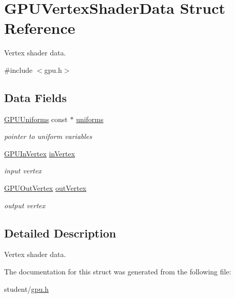 \hypertarget{structGPUVertexShaderData}{}\section{G\+P\+U\+Vertex\+Shader\+Data Struct Reference}
\label{structGPUVertexShaderData}


Vertex shader data.  




{\ttfamily \#include $<$gpu.\+h$>$}

\subsection*{Data Fields}
\begin{DoxyCompactItemize}
\item 
\mbox{\label{structGPUVertexShaderData_a0edb787d17cbca1ce03740b0a4296e0b}} 
\hyperlink{structGPUUniforms}{G\+P\+U\+Uniforms} const  $\ast$ \hyperlink{structGPUVertexShaderData_a0edb787d17cbca1ce03740b0a4296e0b}{uniforms}
\begin{DoxyCompactList}\small\item\em pointer to uniform variables \end{DoxyCompactList}\item 
\mbox{\label{structGPUVertexShaderData_a5744e11986f6ac290817370ed6b45726}} 
\hyperlink{structGPUInVertex}{G\+P\+U\+In\+Vertex} \hyperlink{structGPUVertexShaderData_a5744e11986f6ac290817370ed6b45726}{in\+Vertex}
\begin{DoxyCompactList}\small\item\em input vertex \end{DoxyCompactList}\item 
\mbox{\label{structGPUVertexShaderData_afc21ec723cd5a50da3435f5982b08995}} 
\hyperlink{structGPUOutVertex}{G\+P\+U\+Out\+Vertex} \hyperlink{structGPUVertexShaderData_afc21ec723cd5a50da3435f5982b08995}{out\+Vertex}
\begin{DoxyCompactList}\small\item\em output vertex \end{DoxyCompactList}\end{DoxyCompactItemize}


\subsection{Detailed Description}
Vertex shader data. 

The documentation for this struct was generated from the following file\+:\begin{DoxyCompactItemize}
\item 
student/\hyperlink{gpu_8h}{gpu.\+h}\end{DoxyCompactItemize}
